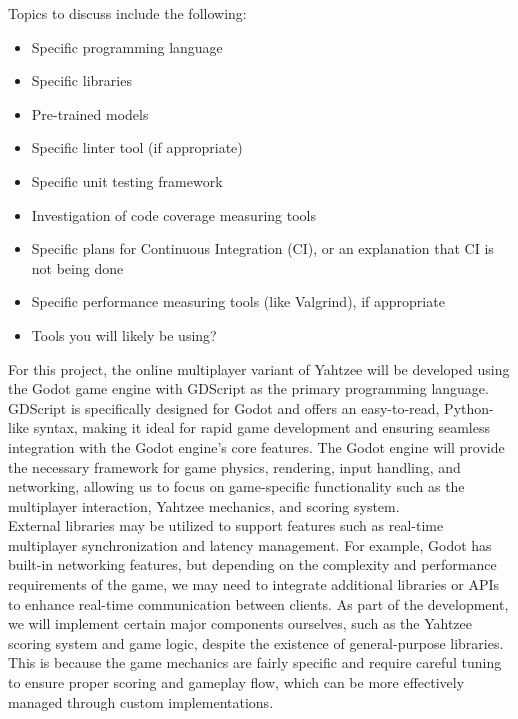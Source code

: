 \documentclass{article}
\begin{document}

Topics to discuss include the following:

\begin{itemize}
\item Specific programming language
\item Specific libraries
\item Pre-trained models
\item Specific linter tool (if appropriate)
\item Specific unit testing framework
\item Investigation of code coverage measuring tools
\item Specific plans for Continuous Integration (CI), or an explanation that CI
  is not being done
\item Specific performance measuring tools (like Valgrind), if
  appropriate
\item Tools you will likely be using?
\end{itemize}

For this project, the online multiplayer variant of Yahtzee will be developed using the Godot game engine with GDScript as the primary programming language. GDScript is specifically designed for Godot and offers an easy-to-read, Python-like syntax, making it ideal for rapid game development and ensuring seamless integration with the Godot engine's core features. The Godot engine will provide the necessary framework for game physics, rendering, input handling, and networking, allowing us to focus on game-specific functionality such as the multiplayer interaction, Yahtzee mechanics, and scoring system. \\

External libraries may be utilized to support features such as real-time multiplayer synchronization and latency management. For example, Godot has built-in networking features, but depending on the complexity and performance requirements of the game, we may need to integrate additional libraries or APIs to enhance real-time communication between clients. As part of the development, we will implement certain major components ourselves, such as the Yahtzee scoring system and game logic, despite the existence of general-purpose libraries. This is because the game mechanics are fairly specific and require careful tuning to ensure proper scoring and gameplay flow, which can be more effectively managed through custom implementations. \\
\end{document}
